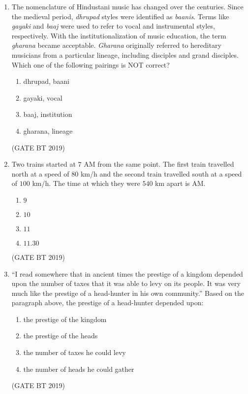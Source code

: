 \documentclass[journal,12pt,onecolumn]{IEEEtran}
\begin{document}
\begin{enumerate}
    \item The nomenclature of Hindustani music has changed over the centuries. Since the medieval period, \textit{dhrupad} styles were identified as \textit{baanis}. Terms like \textit{gayaki} and \textit{baaj} were used to refer to vocal and instrumental styles, respectively. With the institutionalization of music education, the term \textit{gharana} became acceptable. \textit{Gharana} originally referred to hereditary musicians from a particular lineage, including disciples and grand disciples.  
    Which one of the following pairings is NOT correct?
    \begin{enumerate}
        \item dhrupad, baani  
        \item gayaki, vocal  
        \item baaj, institution  
        \item gharana, lineage  
    \end{enumerate}
    \hfill(GATE BT 2019)

    \item Two trains started at $7$ AM from the same point. The first train travelled north at a speed of $80$ km/h and the second train travelled south at a speed of $100$ km/h. The time at which they were $540$ km apart is AM.
    \begin{multicols}{4}
    \begin{enumerate}
        \item $9$  
        \item $10$  
        \item $11$  
        \item $11.30$  
    \end{enumerate}
    \end{multicols}\hfill(GATE BT 2019)

    \item “I read somewhere that in ancient times the prestige of a kingdom depended upon the number of taxes that it was able to levy on its people. It was very much like the prestige of a head-hunter in his own community.”  
    Based on the paragraph above, the prestige of a head-hunter depended upon:
    \begin{enumerate}
        \item the prestige of the kingdom  
        \item the prestige of the heads  
        \item the number of taxes he could levy  
        \item the number of heads he could gather  
    \end{enumerate}
    \hfill(GATE BT 2019)



\end{enumerate}
\end{document}
